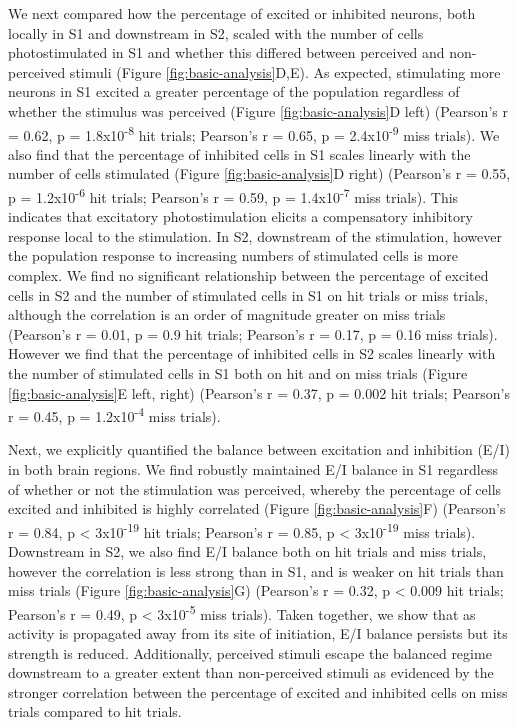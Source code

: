 We next compared how the percentage of excited or inhibited neurons, both locally in S1 and downstream in S2, scaled with the number of cells photostimulated in S1 and whether this differed between perceived and non-perceived stimuli (Figure \ref{fig:basic-analysis}D,E). As expected, stimulating more neurons in S1 excited a greater percentage of the population regardless of whether the stimulus was perceived (Figure \ref{fig:basic-analysis}D left)  (Pearson’s r = 0.62, p  = 1.8x10\textsuperscript{-8} hit trials; Pearson’s r = 0.65, p = 2.4x10\textsuperscript{-9} miss trials). We also find that the percentage of inhibited cells in S1 scales linearly with the number of cells stimulated (Figure \ref{fig:basic-analysis}D right) (Pearson’s r = 0.55, p = 1.2x10\textsuperscript{-6} hit trials; Pearson’s r = 0.59, p = 1.4x10\textsuperscript{-7} miss trials). This indicates that excitatory photostimulation elicits a compensatory inhibitory response local to the stimulation. In S2, downstream of the stimulation, however the population response to increasing numbers of stimulated cells is more complex. We find no significant relationship between the percentage of excited cells in S2 and the number of stimulated cells in S1 on hit trials or miss trials, although the correlation is an order of magnitude greater on miss trials (Pearson’s r = 0.01, p = 0.9 hit trials; Pearson’s r = 0.17, p = 0.16 miss trials). However we find that the percentage of inhibited cells in S2 scales linearly with the number of stimulated cells in S1 both on hit and on miss trials (Figure \ref{fig:basic-analysis}E left, right) (Pearson’s r = 0.37, p = 0.002 hit trials; Pearson’s r = 0.45, p = 1.2x10\textsuperscript{-4} miss trials).

Next, we explicitly quantified the balance between excitation and inhibition (E/I) in both brain regions. We find robustly maintained E/I balance in S1 regardless of whether or not the stimulation was perceived, whereby the percentage of cells excited and inhibited is highly correlated (Figure \ref{fig:basic-analysis}F) (Pearson’s r = 0.84, p < 3x10\textsuperscript{-19} hit trials; Pearson’s r = 0.85, p < 3x10\textsuperscript{-19} miss trials). Downstream in S2, we also find E/I balance both on hit trials and miss trials, however the correlation is less strong than in S1, and is weaker on hit trials than miss trials (Figure \ref{fig:basic-analysis}G) (Pearson’s r = 0.32, p < 0.009 hit trials; Pearson’s r = 0.49, p < 3x10\textsuperscript{-5} miss trials). Taken together, we show that as activity is propagated away from its site of initiation, E/I balance persists but its strength is reduced. Additionally, perceived stimuli escape the balanced regime downstream to a greater extent than non-perceived stimuli as evidenced by the stronger correlation between the percentage of excited and inhibited cells on miss trials compared to hit trials. 


